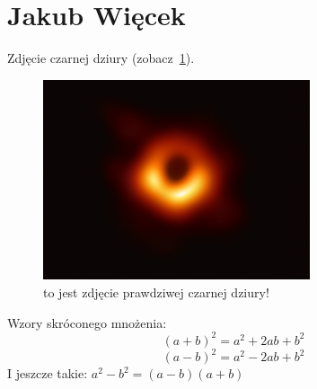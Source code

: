 \section{Jakub Więcek}
\label{sec:jakubwiecek}

Zdjęcie czarnej dziury (zobacz~\ref{fig:blackhole}).

\begin{figure}[htbp]
    \centering
    \includegraphics[width=0.7\textwidth]{pictures/blackhole.jpg}
    \caption{to jest zdjęcie prawdziwej czarnej dziury!}
    \label{fig:blackhole}
\end{figure}



Wzory skróconego mnożenia:
\[(a+b)^2=a^2+2ab+b^2\]
\[(a-b)^2=a^2-2ab+b^2\]
I jeszcze takie:
$ a^2-b^2=(a-b)(a+b) $